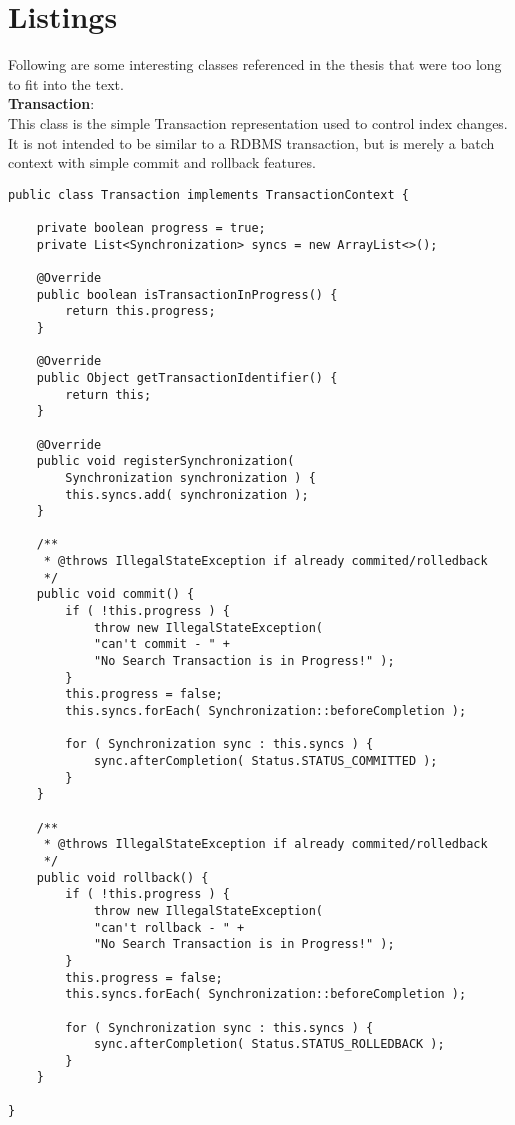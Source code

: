 \section*{Listings}

Following are some interesting classes referenced in the thesis that were too long to fit into the text.
\\

\noindent
\textbf{Transaction}:\\
This class is the simple Transaction representation used to control index changes. It is not intended to be similar to a RDBMS transaction, but is merely a batch context with simple commit and rollback features.
\\
\lstset{language=java}
\begin{lstlisting}[frame=htrbl, caption={the simple Transaction contract}, label={lst:Transaction.java}]
public class Transaction implements TransactionContext {

	private boolean progress = true;
	private List<Synchronization> syncs = new ArrayList<>();
	
	@Override
	public boolean isTransactionInProgress() {
		return this.progress;
	}
	
	@Override
	public Object getTransactionIdentifier() {
		return this;
	}
	
	@Override
	public void registerSynchronization(
		Synchronization synchronization ) {
		this.syncs.add( synchronization );
	}
	
	/**
	 * @throws IllegalStateException if already commited/rolledback
	 */
	public void commit() {
		if ( !this.progress ) {
			throw new IllegalStateException( 
			"can't commit - " + 
			"No Search Transaction is in Progress!" );
		}
		this.progress = false;
		this.syncs.forEach( Synchronization::beforeCompletion );
		
		for ( Synchronization sync : this.syncs ) {
			sync.afterCompletion( Status.STATUS_COMMITTED );
		}
	}
	
	/**
	 * @throws IllegalStateException if already commited/rolledback
 	 */
	public void rollback() {
		if ( !this.progress ) {
			throw new IllegalStateException( 
			"can't rollback - " + 
			"No Search Transaction is in Progress!" );
		}
		this.progress = false;
		this.syncs.forEach( Synchronization::beforeCompletion );
	
		for ( Synchronization sync : this.syncs ) {
			sync.afterCompletion( Status.STATUS_ROLLEDBACK );
		}
	}

}
\end{lstlisting}

